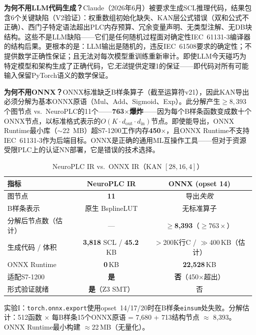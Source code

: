 \documentclass[journal,onecolumn]{IEEEtran}
\theoremstyle{definition}
\theoremstyle{plain}
\theoremstyle{remark}
\renewcommand{\arraystretch}{1.15}
\begin{document}
\textbf{为何不用LLM代码生成？}Claude（2026年6月）被要求生成SCL推理代码，结果包含6个关键缺陷（V2验证）：权重数组初始化缺失、KAN层公式错误（双和公式不正确）、西门子特定语法超出PLC内存预算、冗余变量声明、无类型注解、无DB块结构。这些不是LLM缺陷——它们是任何随机过程面对确定性IEC~61131-3编译器的结构后果。更根本的是：LLM输出是随机的，违反IEC~61508要求的确定性；不提供数学正确性保证；且无法对每次模型重训练重新审计。即使LLM今天碰巧为特定模型和架构生成了正确代码，它\textit{无法}提供定理1的保证——即代码对所有可能输入保留PyTorch语义的数学保证。

\textbf{为何不用ONNX？}ONNX标准缺乏B样条算子（截至运算符v21），因此KAN导出必须分解为基本ONNX原语（Mul、Add、Sigmoid、Exp）。此分解产生$\geq 8{,}393$个图节点 vs.\ NeuroPLC的11个——\textbf{763$\times$爆炸}——因为每个B样条函数变成数十个ONNX节点，以标准格式表示的$O(K \cdot d_{\text{out}} \cdot d_{\text{in}})$节点。即使能导出，ONNX Runtime最小库（$\sim$22~MB）超S7-1200工作内存\textbf{450$\times$}，且ONNX Runtime不支持IEC~61131-3作为后端目标。ONNX是正确的通用ML互操作工具——但对于资源受限PLC上的认证NN部署，它是错误的技术选择。

\begin{table}[!t]
    \centering
    \caption{NeuroPLC IR vs.\ ONNX IR（KAN $[28,16,4]$）}
    \label{tab:onnx_vs_ir}
    \footnotesize
    \renewcommand{\arraystretch}{1.0}
    \begin{tabular}{@{}lcc@{}}
        \toprule
        \textbf{指标} & \textbf{NeuroPLC IR} & \textbf{ONNX (opset 14)} \\
        \midrule
        图节点                    & \textbf{11}            & 导出\textit{失败} \\
        B样条表示                  & 原生 BsplineLUT         & 无标准算子 \\
        分解后节点数（估计）       & ---                    & $\geq$\textbf{8,393}（$\geq 763\times$） \\
        生成代码 / 体积            & \textbf{3,818} SCL / \textbf{45.2}\,KB & $>$200K行C / $\gg$400\,KB（估计） \\
        ONNX Runtime              & \textbf{0}\,KB          & \textbf{22,528}\,KB \\
        适配S7-1200               & \textbf{是}             & \textbf{否}（450$\times$超出） \\
        形式验证就绪              & \textbf{是}（Z3 SMT）   & 否 \\
        \bottomrule
    \end{tabular}
    \vspace{2pt}
    {\scriptsize 实验I：\texttt{torch.onnx.export}使用opset~14/17/20时在B样条\texttt{einsum}处失败。分解估计：512函数 $\times$ 每B样条15个ONNX原语 = 7{,}680 + 713结构节点 $\approx$ 8{,}393。ONNX Runtime最小构建 $\approx$22\,MB（无量化）。}
\end{table}
\end{document}

